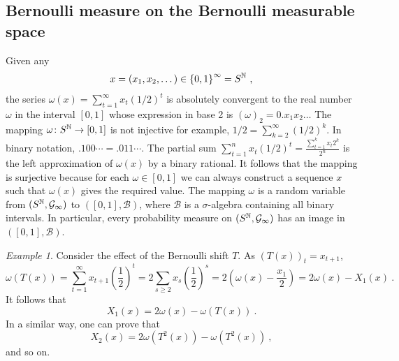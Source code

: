 \documentclass[12pt,a4paper]{amsart}
\theoremstyle{plain}%
\theoremstyle{definition}
\theoremstyle{remark}
\newtheorem{example}{Example}
\begin{document}
\bigskip

\subsection{Bernoulli measure on the Bernoulli measurable space}
\label{sec:bern-meas-bern}

Given any
\begin{equation*}
  x = (x_1,x_2,\dots)\in \left\{0,1\right\}^\infty = S^{\mathbb{N}} \ ,
\end{equation*}
the series $\omega(x) = \sum_{t=1}^\infty x_t (1/2)^t$ is absolutely convergent to the real number $\omega$ in the interval $[0,1]$ whose expression in base 2 is  $(\omega)_2 = 0.x_1x_2\dots$ The mapping $\omega \colon S^{\mathbb{N}} \to [0,1]$ is not injective for example, $1/2=\sum_{k=2}^\infty (1/2)^k$. In binary notation, $.100\cdots = .011\cdots$.
The partial sum $\sum_{t=1}^n x_t (1/2)^t = \frac{\sum_{t=1}^k x_t 2^k}{2^n}$ is the left approximation of $\omega(x)$ by a binary rational. It follows that the mapping is surjective because for each $\omega \in [0,1]$ we can always construct a sequence $x$ such that $\omega(x)$ gives the required value. The mapping $\omega$ is a random variable from $(S^{\mathbb{N}},\mathcal G_\infty)$ to $([0,1],\mathcal B)$, where $\mathcal B$ is a $\sigma$-algebra containing all binary intervals. In particular, every probability measure on $(S^{\mathbb{N}},\mathcal G_\infty)$ has an image in $([0,1],\mathcal B)$.  

\begin{example}
  Consider the effect of the Bernoulli shift $T$. As $(T(x))_t = x_{t+1}$,
\begin{equation*}
  \omega(T(x)) = \sum_{t=1}^\infty x_{t+1}\left(\frac12\right)^t = 2 \sum_{s \geq 2} x_s \left(\frac12\right)^s = 2 \left(\omega(x) - \frac{x_1}2\right) = 2\omega(x) - X_1(x) \ .
\end{equation*}
It follows that
\begin{equation*}
X_1(x) = 2\omega(x) - \omega(T(x)) \ . 
\end{equation*}
In a similar way, one can prove that
\begin{equation*}
  X_2(x) = 2\omega(T^2(x)) - \omega(T^2(x)) \ ,
\end{equation*}
and so on.
\end{example}
\end{document}
